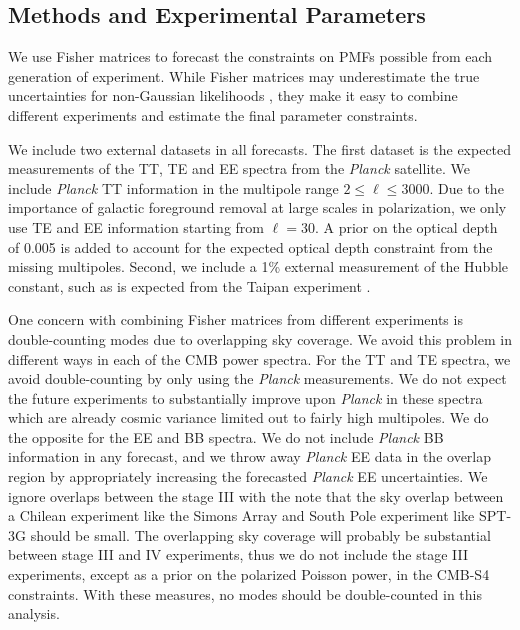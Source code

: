 \documentclass[apj]{emulateapj}
\newcommand{\planck}{{\sl Planck}}
\begin{document}
\subsection{Methods and Experimental Parameters}

We use Fisher matrices to forecast the constraints on PMFs possible from each generation of experiment. 
While Fisher matrices may underestimate the true uncertainties for non-Gaussian likelihoods \citep[see e.g.,][]{wolz12}, they 
 make it easy to combine different experiments and estimate the final parameter constraints. 
 


We include two external datasets in all forecasts. 
The first dataset is the expected measurements of the  TT, TE and EE spectra from the \planck{} satellite. 
We include \planck{} TT information in the multipole range $2\le \ell \le 3000$. 
Due to the importance of galactic foreground removal at large scales in polarization, we only use TE and EE information starting from $\ell = 30$. 
A prior on the optical depth of 0.005 is added to account for the expected optical depth constraint from the missing multipoles. 
Second, we include a 1\% external measurement of the Hubble constant, such as is expected from the Taipan experiment \citep{kuehn14}. 

One concern with combining Fisher matrices from different experiments is double-counting modes due to overlapping sky coverage. 
We avoid this problem in different ways in each of the CMB power spectra. 
For the TT and TE spectra, we avoid double-counting by only using the \planck{} measurements. 
We do not expect the future experiments to substantially improve upon \planck{} in these spectra which are already cosmic variance limited out to fairly high multipoles. 
We do the opposite for the EE and BB spectra. 
We do not include \planck{} BB information in any forecast, and  we throw away \planck{} EE data in the overlap region by appropriately increasing the forecasted \planck{} EE uncertainties. 
We ignore overlaps between the stage III  with the note that the sky overlap between a Chilean experiment like the Simons Array and South Pole experiment like SPT-3G should be small. 
The overlapping sky coverage will probably be substantial between stage III and IV experiments, thus we do not include the stage III experiments, except as a prior on the polarized Poisson power, in the CMB-S4 constraints. 
With these measures, no modes should be double-counted in this analysis. 
\end{document}

